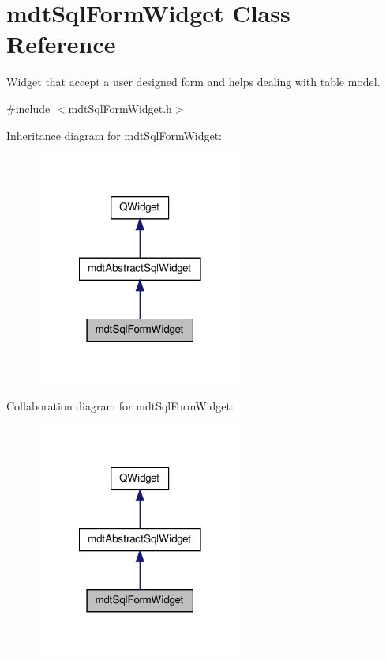 \hypertarget{classmdt_sql_form_widget}{\section{mdt\-Sql\-Form\-Widget Class Reference}
\label{classmdt_sql_form_widget}
}


Widget that accept a user designed form and helps dealing with table model.  




{\ttfamily \#include $<$mdt\-Sql\-Form\-Widget.\-h$>$}



Inheritance diagram for mdt\-Sql\-Form\-Widget\-:\nopagebreak
\begin{figure}[H]
\begin{center}
\leavevmode
\includegraphics[width=194pt]{classmdt_sql_form_widget__inherit__graph}
\end{center}
\end{figure}


Collaboration diagram for mdt\-Sql\-Form\-Widget\-:\nopagebreak
\begin{figure}[H]
\begin{center}
\leavevmode
\includegraphics[width=194pt]{classmdt_sql_form_widget__coll__graph}
\end{center}
\end{figure}
